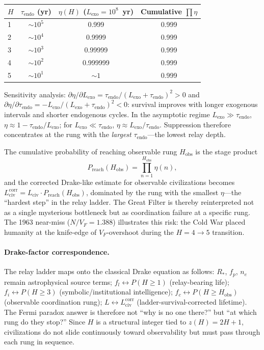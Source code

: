 \documentclass[11pt]{article}
\begin{document}
\begin{center}
\begin{tabular}{lccc}
\toprule
$H$ & $\tau_{\mathrm{endo}}$ (yr) & $\eta(H)$ ($L_{\mathrm{exo}} = 10^8$~yr) & Cumulative $\prod \eta$ \\
\midrule
1 & $\sim 10^5$ & 0.999 & 0.999 \\
2 & $\sim 10^4$ & 0.9999 & 0.999 \\
3 & $\sim 10^3$ & 0.99999 & 0.999 \\
4 & $\sim 10^2$ & 0.999999 & 0.999 \\
5 & $\sim 10^1$ & $\sim 1$ & 0.999 \\
\bottomrule
\end{tabular}
\end{center}

Sensitivity analysis:
$\partial\eta/\partial L_{\mathrm{exo}} = \tau_{\mathrm{endo}}/(L_{\mathrm{exo}}+\tau_{\mathrm{endo}})^2 > 0$ and
$\partial\eta/\partial\tau_{\mathrm{endo}} = -L_{\mathrm{exo}}/(L_{\mathrm{exo}}+\tau_{\mathrm{endo}})^2 < 0$:
survival improves with longer exogenous intervals and shorter endogenous cycles.
In the asymptotic regime $L_{\mathrm{exo}}\gg\tau_{\mathrm{endo}}$, $\eta\approx 1-\tau_{\mathrm{endo}}/L_{\mathrm{exo}}$;
for $L_{\mathrm{exo}}\ll\tau_{\mathrm{endo}}$, $\eta\approx L_{\mathrm{exo}}/\tau_{\mathrm{endo}}$.
Suppression therefore concentrates at the rung with the \emph{largest} $\tau_{\mathrm{endo}}$---the lowest relay depth.

The cumulative probability of reaching observable rung $H_{\mathrm{obs}}$ is the stage product
\begin{equation}
P_{\mathrm{reach}}(H_{\mathrm{obs}}) = \prod_{n=1}^{H_{\mathrm{obs}}} \eta(n),
\label{eq:Preach}
\end{equation}
and the corrected Drake-like estimate for observable civilizations becomes $L_{\mathrm{civ}}^{\mathrm{corr}} = L_{\mathrm{civ}} \cdot P_{\mathrm{reach}}(H_{\mathrm{obs}})$, dominated by the rung with the smallest $\eta$---the ``hardest step'' in the relay ladder.
The Great Filter is thereby reinterpreted not as a single mysterious bottleneck but as coordination failure at a specific rung.
The 1963 near-miss ($N/V_F = 1.388$) illustrates this risk: the Cold War placed humanity at the knife-edge of $V_F$-overshoot during the $H=4\to 5$ transition.

\paragraph{Drake-factor correspondence.}
The relay ladder maps onto the classical Drake equation as follows:
$R_*$, $f_p$, $n_e$ remain astrophysical source terms;
$f_l \leftrightarrow P(H\ge 1)$ (relay-bearing life);
$f_i \leftrightarrow P(H\ge 3)$ (symbolic/institutional intelligence);
$f_c \leftrightarrow P(H\ge H_{\mathrm{obs}})$ (observable coordination rung);
$L \leftrightarrow L_{\mathrm{civ}}^{\mathrm{corr}}$ (ladder-survival-corrected lifetime).
The Fermi paradox answer is therefore not ``why is no one there?'' but ``at which rung do they stop?''
Since $H$ is a structural integer tied to $z(H)=2H+1$, civilizations do not slide continuously toward observability but must pass through each rung in sequence.
\end{document}
